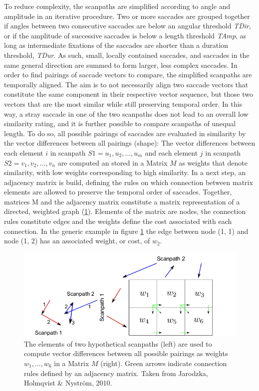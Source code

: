\documentclass[a4paper, 12pt]{scrreprt}
\begin{document}
To reduce complexity, the scanpaths are simplified according to angle and amplitude in an iterative procedure. Two or more saccades are grouped together if angles between two consecutive saccades are below an angular threshold \textit{TDir}, or if the amplitude of successive saccades is below a length threshold \textit{TAmp}, as long as intermediate fixations of the saccades are shorter than a duration threshold, \textit{TDur}. As such, small, locally contained saccades, and saccades in the same general direction are summed to form larger, less complex saccades. \newline
In order to find pairings of saccade vectors to compare, the simplified scanpaths are temporally aligned. The aim is to not necessarily align two saccade vectors that constitute the same component in  their respective vector sequence, but those two vectors that are the most similar while still preserving temporal order. In this way, a stray saccade in one of the two scanpaths does not lead to an overall low similarity rating, and it is further possible to compare scanpaths of unequal length.  To do so, all possible pairings of saccades are evaluated in similarity by the vector differences between all pairings (shape): The vector differences between each element $i$ in scanpath $S1 = {u_1, u_2, \ldots, u_m}$ and each element $j$ in scanpath $S2 = {v_1, v_2, \ldots, v_n}$ are computed an stored in a Matrix $M$ as weights that denote similarity, with low weights corresponding to high similarity. In a next step, an adjacency matrix is build, defining the rules on which connection between matrix elements are allowed to preserve the temporal order of saccades. Together, matrices M and the adjacency matrix constitute a matrix representation of a directed, weighted graph (\ref{fig:directedgraph}). Elements of the matrix are nodes, the connection rules constitute edges and the weights define the cost associated with each connection. 
In the generic example in figure \ref{fig:directedgraph} the edge between node (1, 1) and node (1, 2) has an associated weight, or cost, of $w_2$. 


\begin{figure}
	\includegraphics[scale=0.4]{img/weightedgraph.png}
	\caption[Scanpath alignment as a shortest-path-problem]
	{\small{The elements of two hypothetical scanpaths (left) are used to compute vector differences between all possible pairings as weights $w_1, \ldots, w_6$ in a Matrix $M$ (right). Green arrows indicate connection rules defined by an adjacency matrix. Taken from Jarodzka, Holmqvist \& Nyström, 2010.}}
	\label{fig:directedgraph}
\end{figure}
\end{document}
